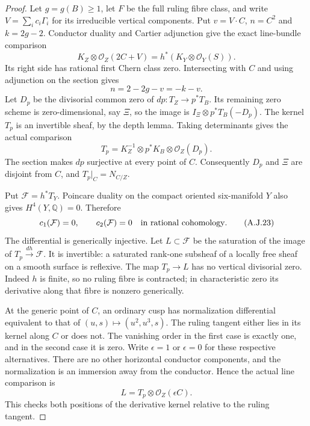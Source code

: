 \begin{proof}
Let $g=g(B)\geq1$, let $F$ be the full ruling fibre
class, and write $V=\sum_i c_i\Gamma_i$ for its
irreducible vertical components. Put
$v=V\cdot C$, $n=C^2$ and $k=2g-2$.
Conductor duality and Cartier adjunction give the exact
line-bundle comparison
\[
 K_Z\otimes\mathcal O_Z(2C+V)
       =h^*(K_Y\otimes\mathcal O_Y(S)).
                                                        \tag{A.J.21}\label{cdp:eq:A.J.21}
\]
Its right side has rational first Chern class zero.
Intersecting with $C$ and using adjunction on the section
gives
\[
 n=2-2g-v=-k-v.                                  \tag{A.J.22}\label{cdp:eq:A.J.22}
\]
Let $D_p$ be the divisorial common zero of
$dp:T_Z\to p^*T_B$. Its remaining zero scheme is
zero-dimensional, say $\Xi$, so the image is
$I_\Xi\otimes p^*T_B(-D_p)$.
The kernel $T_p$ is an invertible sheaf, by the depth
lemma. Taking determinants gives the actual comparison
\[
 T_p=K_Z^{-1}\otimes p^*K_B\otimes\mathcal O_Z(D_p).
\]
The section makes $dp$ surjective at every point of $C$.
Consequently $D_p$ and $\Xi$ are disjoint from $C$,
and $T_p|_C=N_{C/Z}$.

Put $\mathcal F=h^*T_Y$. Poincare duality on the compact
oriented six-manifold $Y$ also gives
$H^4(Y,\mathbb Q)=0$. Therefore
\[
 c_1(\mathcal F)=0,\qquad c_2(\mathcal F)=0
        \quad\hbox{in rational cohomology}.       \tag{A.J.23}\label{cdp:eq:A.J.23}
\]
The differential is generically injective. Let
$L\subset\mathcal F$ be the saturation of the image
of $T_p\xrightarrow{dh}\mathcal F$.
It is invertible: a saturated rank-one subsheaf of a
locally free sheaf on a smooth surface is reflexive.
The map $T_p\to L$ has no vertical divisorial zero.
Indeed $h$ is finite, so no ruling fibre is contracted;
in characteristic zero its derivative along that fibre
is nonzero generically.

At the generic point of $C$, an ordinary cusp has
normalization differential equivalent to that of
$(u,s)\mapsto(u^2,u^3,s)$.
The ruling tangent either lies in its kernel along $C$
or does not. The vanishing order in the first case is
exactly one, and in the second case it is zero.
Write $\epsilon=1$ or $\epsilon=0$ for these respective
alternatives. There are no other horizontal conductor
components, and the normalization is an immersion away
from the conductor. Hence the actual line comparison is
\[
 L=T_p\otimes\mathcal O_Z(\epsilon C).
                                                        \tag{A.J.24}\label{cdp:eq:A.J.24}
\]
This checks both positions of the derivative kernel
relative to the ruling tangent.


\end{proof}
